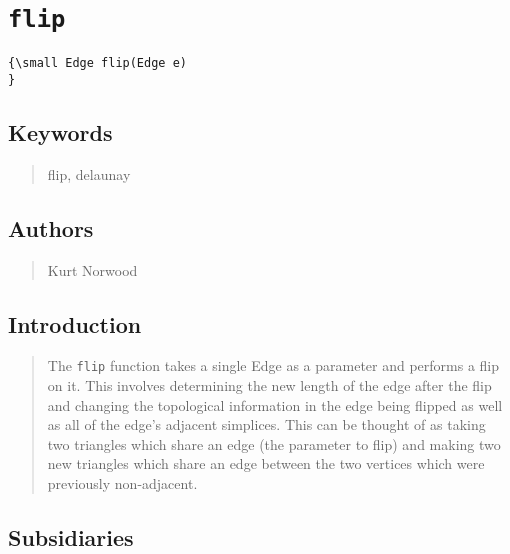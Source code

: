                       


\section*{\texttt{flip}}

\label{f0}{\small }
\begin{verbatim}
{\small Edge flip(Edge e)
}
\end{verbatim}

\subsection*{Keywords}

\begin{quotation}
flip, delaunay
\end{quotation}

\subsection*{Authors}

\begin{quotation}
Kurt Norwood
\end{quotation}

\subsection*{Introduction}

\begin{quotation}
The \texttt{flip} function takes a single Edge as a parameter and performs a
flip on it. This involves determining the new length of the edge after the
flip and changing the topological information in the edge being flipped as
well as all of the edge's adjacent simplices. This can be thought of as
taking two triangles which share an edge (the parameter to flip) and making
two new triangles which share an edge between the two vertices which were
previously non-adjacent.
\end{quotation}

\subsection*{Subsidiaries}

